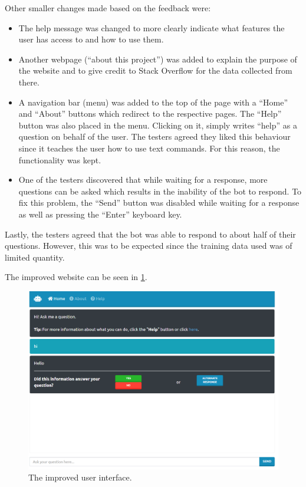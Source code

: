 \documentclass[12pt,a4paper]{article}
\newcommand{\captionstyle}[1] {
    \small{#1}
}
\begin{document}
Other smaller changes made based on the feedback were:
\begin{itemize}
    \item The help message was changed to more clearly indicate what features the user has access to and how to use them.
    \item Another webpage (\enquote{about this project}) was added to explain the purpose of the website and to give credit to Stack Overflow for the data collected from there.
    \item A navigation bar (menu) was added to the top of the page with a \enquote{Home} and \enquote{About} buttons which redirect to the respective pages. The \enquote{Help} button was also placed in the menu. Clicking on it, simply writes \enquote{help} as a question on behalf of the user. The testers agreed they liked this behaviour since it teaches the user how to use text commands. For this reason, the functionality was kept.
    \item One of the testers discovered that while waiting for a response, more questions can be asked which results in the inability of the bot to respond. To fix this problem, the \enquote{Send} button was disabled while waiting for a response as well as pressing the \enquote{Enter} keyboard key. 
\end{itemize}

Lastly, the testers agreed that the bot was able to respond to about half of their questions. However, this was to be expected since the training data used was of limited quantity.

The improved website can be seen in \cref{fig:newui}.

\begin{figure}[!htb]%
    \centering
    \includegraphics[width=1\columnwidth]{newinterface}%
    \caption{\captionstyle{The improved user interface.}}%
    \label{fig:newui}%
\end{figure}
\end{document}
